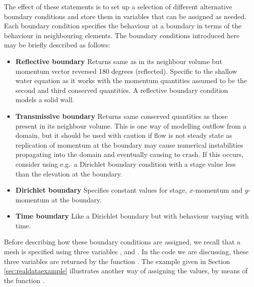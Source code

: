 \documentclass{manual}
\begin{document}
The effect of these statements is to set up a selection of different
alternative boundary conditions and store them in variables that can be
assigned as needed. Each boundary condition specifies the
behaviour at a boundary in terms of the behaviour in neighbouring
elements. The boundary conditions introduced here may be briefly described as
follows:
\begin{itemize}
    \item \textbf{Reflective boundary}\label{def:reflective boundary}
          Returns same  as in its neighbour volume but momentum
          vector reversed 180 degrees (reflected).
          Specific to the shallow water equation as it works with the
          momentum quantities assumed to be the second and third conserved
          quantities. A reflective boundary condition models a solid wall.
    \item \textbf{Transmissive boundary}\label{def:transmissive boundary}
          Returns same conserved quantities as
          those present in its neighbour volume. This is one way of modelling
          outflow from a domain, but it should be used with caution if flow is
          not steady state as replication of momentum at the boundary
          may cause numerical instabilities propagating into the domain and
          eventually causing \anuga to crash. If this occurs,
          consider using e.g.\ a Dirichlet boundary condition with a stage value
          less than the elevation at the boundary.
    \item \textbf{Dirichlet boundary}\label{def:dirichlet boundary} Specifies
          constant values for stage, $x$-momentum and $y$-momentum at the boundary.
    \item \textbf{Time boundary}\label{def:time boundary} Like a Dirichlet
          boundary but with behaviour varying with time.
\end{itemize}

\label{ref:tagdescription}Before describing how these boundary
conditions are assigned, we recall that a mesh is specified using
three variables ,  and .
In the code we are discussing, these three variables are returned by
the function . The example given in
Section \ref{sec:realdataexample} illustrates another way of
assigning the values, by means of the function
.
\end{document}

